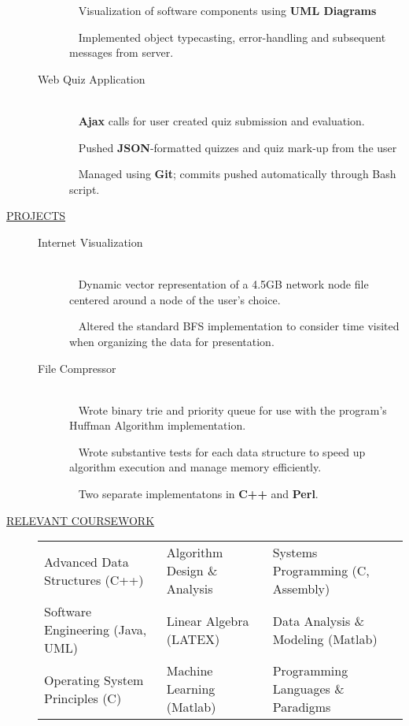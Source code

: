 \documentclass[12pt]{article}
\begin{document}
\begin{description}
\begin{description}
            \textbullet ~ Visualization of software components using {\bf UML Diagrams}

            \textbullet ~ Implemented object typecasting, error-handling and subsequent messages from server.

		\item[Web Quiz Application] \hfill \\
            \textbullet ~ {\bf Ajax} calls for user created quiz submission and evaluation.

            \textbullet ~ Pushed {\bf JSON}-formatted quizzes and quiz mark-up from the user

            \textbullet ~ Managed using {\bf Git}; commits pushed automatically through Bash script.

        \end{description}


    \item[\underline{PROJECTS}] \hfill
        \begin{description}
        \item[Internet Visualization] \hfill \\
		    \textbullet ~ Dynamic vector representation of a 4.5GB network node file centered around a
            node of the user's choice.

            \textbullet ~ Altered the standard BFS implementation to consider time visited when
            organizing the data for presentation.

		\item[File Compressor] \hfill \\
            \textbullet ~ Wrote binary trie and priority queue for use with the program's Huffman Algorithm implementation.

            \textbullet ~ Wrote substantive tests for each data
                structure to speed up algorithm execution and manage memory efficiently.

            \textbullet ~ Two separate implementatons in {\bf C++} and {\bf Perl}.

		\end{description}

    \item[\underline{RELEVANT COURSEWORK}]\hfill

        \begin{tabular}{l|l|l}
            Advanced Data Structures (C++)& Algorithm Design \& Analysis & Systems Programming (C, Assembly)\\
         Software Engineering (Java, UML) & Linear Algebra (LATEX) &  Data Analysis \& Modeling (Matlab) \\
              Operating System Principles (C) & Machine Learning (Matlab) & Programming Languages \& Paradigms\\
        \end{tabular}


\end{description}
\end{document}
